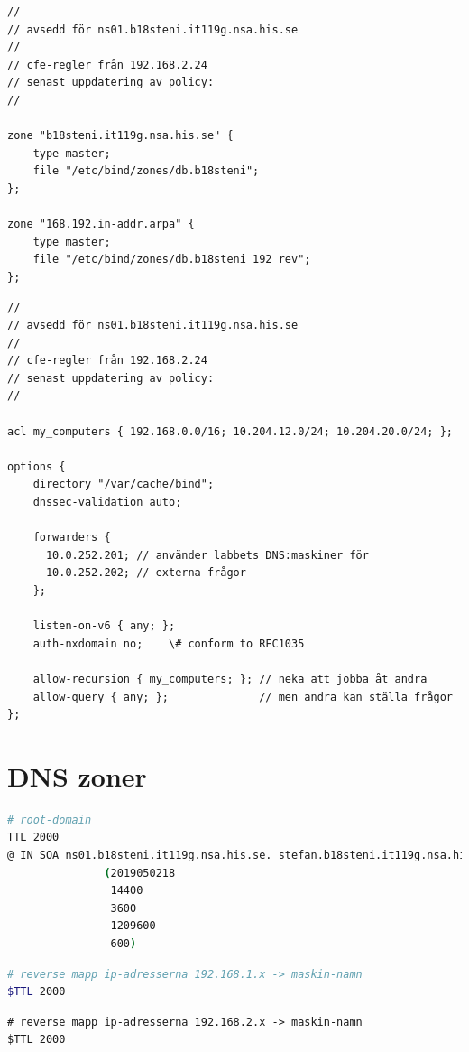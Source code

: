 \documentclass[swedish,10pt,a4paper]{report}
\begin{document}
\begin{lstlisting}[caption={/etc/bind/named.conf.local}]
//
// avsedd för ns01.b18steni.it119g.nsa.his.se
//
// cfe-regler från 192.168.2.24
// senast uppdatering av policy:
//

zone "b18steni.it119g.nsa.his.se" {
    type master;
    file "/etc/bind/zones/db.b18steni";
};

zone "168.192.in-addr.arpa" {
    type master;
    file "/etc/bind/zones/db.b18steni_192_rev";
};
\end{lstlisting}

\begin{lstlisting}[caption={/etc/bind/named.conf.options}]
//
// avsedd för ns01.b18steni.it119g.nsa.his.se
//
// cfe-regler från 192.168.2.24
// senast uppdatering av policy:
//

acl my_computers { 192.168.0.0/16; 10.204.12.0/24; 10.204.20.0/24; };

options {
    directory "/var/cache/bind";
    dnssec-validation auto;

    forwarders {
      10.0.252.201; // använder labbets DNS:maskiner för
      10.0.252.202; // externa frågor
    };

    listen-on-v6 { any; };
    auth-nxdomain no;    \# conform to RFC1035

    allow-recursion { my_computers; }; // neka att jobba åt andra
    allow-query { any; };              // men andra kan ställa frågor
};
\end{lstlisting}

\section{DNS zoner}\label{appendix:dns_zones}

\begin{lstlisting}[language=sh,caption={/etc/bind/zones/db.b18steni.it119g.nsa.his.se}]
# root-domain
TTL 2000
@ IN SOA ns01.b18steni.it119g.nsa.his.se. stefan.b18steni.it119g.nsa.his.se.
               (2019050218
                14400
                3600
                1209600
                600)
\end{lstlisting}

\begin{lstlisting}[language=sh,caption={/etc/bind/zones/db.1.168.192.in-addr.arpa}]
# reverse mapp ip-adresserna 192.168.1.x -> maskin-namn
$TTL 2000
\end{lstlisting}

\begin{lstlisting}[caption={/etc/bind/zones/db.2.168.192.in-addr.arpa}]
# reverse mapp ip-adresserna 192.168.2.x -> maskin-namn
$TTL 2000
\end{lstlisting}
\end{document}

